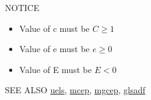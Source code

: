 \begin{qsection}{NOTICE}
\begin{itemize}
\item Value of c must be $C \geq 1$ 
\item Value of e must be $e \geq 0$
\item Value of E must be $E < 0$
\end{itemize}
\end{qsection}

\begin{qsection}{SEE ALSO}
\hyperlink{uels}{uels},
\hyperlink{mcep}{mcep},
\hyperlink{mgcep}{mgcep},
\hyperlink{glsadf}{glsadf}
\end{qsection}
